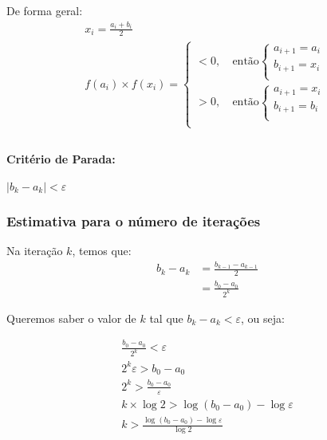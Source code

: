 \documentclass{article}
\begin{document}
        De forma geral:
        \begin{gather*}
            x_i = \frac{a_i + b_i}{2}\\
            f(a_i) \times f(x_i) =
                \begin{cases}
                    < 0,~ & \text{então}
                        \begin{cases}
                            a_{i+1} = a_i\\
                            b_{i+1} = x_i\\
                        \end{cases}\\
                    > 0,~ & \text{então}
                        \begin{cases}
                            a_{i+1} = x_i\\
                            b_{i+1} = b_i\\
                        \end{cases}\\
                \end{cases}\\
        \end{gather*}

        \paragraph{Critério de Parada:} $|b_k - a_k| < \varepsilon$

        \subsubsection*{Estimativa para o número de iterações}
        Na iteração $k$, temos que:
        \begin{align*}
            b_k - a_k &= \frac{b_{k-1} - a_{k-1}}{2}\\
            &= \frac{b_0 - a_0}{2^k}
        \end{align*}

        Queremos saber o valor de $k$ tal que $b_k - a_k < \varepsilon$, ou seja:

        \begin{gather*}
            \frac{b_0 - a_0}{2^k} < \varepsilon\\
            2^k \varepsilon > b_0 - a_0\\
            2^k > \frac{b_0 - a_0}{\varepsilon}\\
            k \times \log{2} > \log{(b_0 - a_0)} - \log{\varepsilon}\\
            \boxed{k > \frac{\log{(b_0 - a_0)} - \log{\varepsilon}}{\log{2}}}
        \end{gather*}
\end{document}
